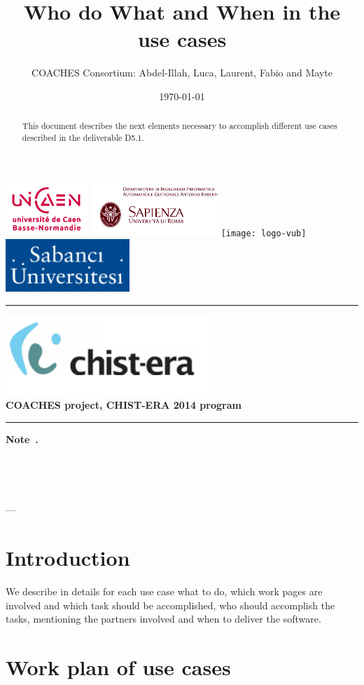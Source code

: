 \documentclass{article}
\title{ Who do What and When in the use cases}
\author{COACHES Consortium: Abdel-Illah, Luca, Laurent, Fabio and Mayte}
\date{\today}
\newcommand{\makemadtitle}{
  \hrule
  \vspace{.5em}
  \noindent
  \begin{center}
  \textbf{
  {\centering\includegraphics[height=3cm]{logoCHISTERA2014}}\\
   {\centering\Large COACHES project, CHIST-ERA 2014 program}
  }
  \end{center}
  \vspace{.5em}
 
  \hrule
  \vspace{3em}
  \begin{center}
    \begin{large}\textbf{ Note~\usebox{\notenumber}.}\end{large}\\[.5em]
    \begin{Large}\textbf{\usebox{\notetitle}}\end{Large}\\[2em]
    \begin{large}\usebox{\noteauthor} --- \usebox{\notedate}\end{large}
  \end{center}
  \vspace{3em}
}
\begin{document}
\includegraphics[height=2cm]{logoUNICAEN}
\includegraphics[height=2cm]{logoSapienza.png}
\texttt{[image: logo-vub]}
\includegraphics[height=2cm]{logoSebanci}


\makemadtitle

\vspace*{1.0in}
\begin{abstract}
 This document describes the next elements necessary to accomplish different use cases described in the deliverable D5.1.
   \end{abstract}

\vspace*{1.5in}

\newpage
\section{Introduction}
 We describe in details for each use case what to do, which work pages are involved and which task should be accomplished, who should accomplish  the tasks, mentioning the partners involved and when to deliver the software.    

\section{Work plan of use cases}
\end{document}

